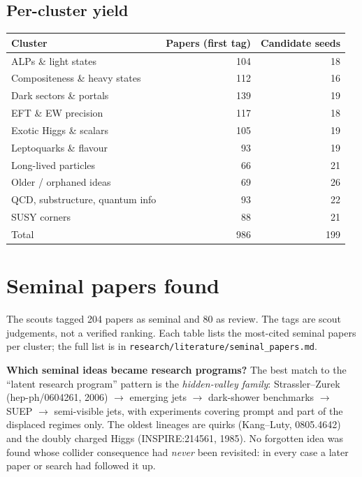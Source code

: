 \documentclass[11pt,a4paper]{article}
\begin{document}
\subsection{Per-cluster yield}
\begin{center}\small\begin{tabular}{lrr}\toprule Cluster & Papers (first tag) & Candidate seeds\\\midrule
ALPs \& light states & 104 & 18\\
Compositeness \& heavy states & 112 & 16\\
Dark sectors \& portals & 139 & 19\\
EFT \& EW precision & 117 & 18\\
Exotic Higgs \& scalars & 105 & 19\\
Leptoquarks \& flavour & 93 & 19\\
Long-lived particles & 66 & 21\\
Older / orphaned ideas & 69 & 26\\
QCD, substructure, quantum info & 93 & 22\\
SUSY corners & 88 & 21\\
\midrule Total & 986 & 199\\\bottomrule\end{tabular}\end{center}
\section{Seminal papers found}\label{sec:seminal}
The scouts tagged 204 papers as seminal and 80 as review. The tags are scout judgements, not a verified ranking. Each table lists the most-cited seminal papers per cluster; the full list is in \texttt{research/literature/seminal\_papers.md}.
\begin{key}\textbf{Which seminal ideas became research programs?} The best match to the ``latent research program'' pattern is the \emph{hidden-valley family}: Strassler--Zurek (hep-ph/0604261, 2006) $\to$ emerging jets $\to$ dark-shower benchmarks $\to$ SUEP $\to$ semi-visible jets, with experiments covering prompt and part of the displaced regimes only. The oldest lineages are quirks (Kang--Luty, 0805.4642) and the doubly charged Higgs (INSPIRE:214561, 1985). No forgotten idea was found whose collider consequence had \emph{never} been revisited: in every case a later paper or search had followed it up.\end{key}
\end{document}
